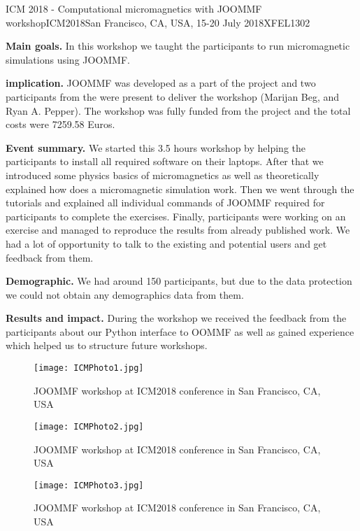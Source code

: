 \begin{event}{ICM 2018 - Computational micromagnetics with JOOMMF workshop}{ICM2018}{San Francisco, CA, USA, 15-20 July 2018}{XFEL}{130}{2}{}

\textbf{Main goals.} In this workshop we taught the participants to run micromagnetic simulations using JOOMMF.

\textbf{\ODK implication.} JOOMMF was developed as a part of the \ODK project and two participants from the \ODK were present to deliver the workshop (Marijan Beg, and Ryan A. Pepper). The workshop was fully funded from the \ODK project and the total costs were 7259.58 Euros.

\textbf{Event summary.} We started this 3.5 hours workshop by helping the participants to install all required software on their laptops. After that we introduced some physics basics of micromagnetics as well as theoretically explained how does a micromagnetic simulation work. Then we went through the tutorials and explained all individual commands of JOOMMF required for participants to complete the exercises. Finally, participants were working on an exercise and managed to reproduce the results from already published work. We had a lot of opportunity to talk to the existing and potential users and get feedback from them.

\textbf{Demographic.} We had around 150 participants, but due to the data protection we could not obtain any demographics data from them.

\textbf{Results and impact.} During the workshop we received the feedback from the participants about our Python interface to OOMMF as well as gained experience which helped us to structure future workshops.

\begin{figure}[ht]
\texttt{[image: ICMPhoto1.jpg]}
\caption*{JOOMMF workshop at ICM2018 conference in San Francisco, CA, USA}
\end{figure}

\begin{figure}[ht]
\texttt{[image: ICMPhoto2.jpg]}
\caption*{JOOMMF workshop at ICM2018 conference in San Francisco, CA, USA}
\end{figure}

\begin{figure}[ht]
\texttt{[image: ICMPhoto3.jpg]}
\caption*{JOOMMF workshop at ICM2018 conference in San Francisco, CA, USA}
\end{figure}

\end{event}
